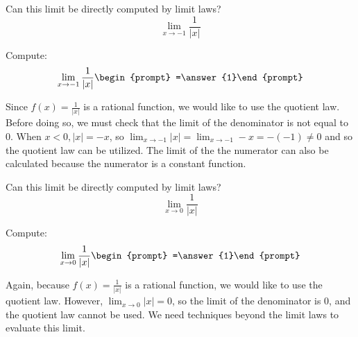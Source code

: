 \documentclass[handout]{ximera}
\begin{document}
\begin{exercise}
  Can this limit be directly computed by limit laws?
  \[
  \displaystyle\lim_{x\to -1} \frac{1}{|x|}
  \]
  \begin{multipleChoice}
  \end{multipleChoice}
  \begin{question}
    Compute:
    \[
    \displaystyle\lim_{x\to -1} \frac{1}{|x|} \begin{prompt} =\answer{1}\end{prompt}
    \]
    \begin{feedback}
      Since $f(x)=\frac{1}{|x|}$ is a rational function, we would like to use the quotient law.  Before doing so, we must check that the limit of the denominator is not equal to $0$.  When $x < 0, |x| = -x$, so $\displaystyle\lim_{x\to -1} |x| = \displaystyle\lim_{x\to -1} -x = -(-1) \neq 0$ and so the quotient law can be utilized. The limit of the the numerator can also be calculated because the numerator is a constant function. 
    \end{feedback}
  \end{question}
\end{exercise}

\begin{exercise}
  Can this limit be directly computed by limit laws?
  \[
  \displaystyle\lim_{x\to 0} \frac{1}{|x|}
  \]
  \begin{multipleChoice}
  \end{multipleChoice}
  \begin{question}
    Compute:
    \[
    \displaystyle\lim_{x\to 0} \frac{1}{|x|} \begin{prompt} =\answer{1}\end{prompt}
    \]
    \begin{feedback}
      Again, because $f(x)=\frac{1}{|x|}$ is a rational function, we would like to use the quotient law.  However, $\displaystyle\lim_{x\to 0} |x| = 0$, so the limit of the denominator is $0$, and the quotient law cannot be used.  We need techniques beyond the limit laws to evaluate this limit. 
    \end{feedback}
  \end{question}
\end{exercise}
\end{document}
